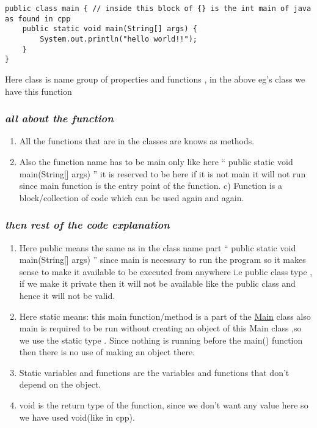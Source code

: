 \documentclass[11pt]{article}
\begin{document}
\begin{verbatim}
public class main { // inside this block of {} is the int main of java as found in cpp
    public static void main(String[] args) {
        System.out.println("hello world!!");
    }
}
\end{verbatim}
Here class is name group of properties and functions , in the above eg's class we have this function
\subsubsection{\emph{all about the function}}
\label{sec:org2ef829a}
\begin{enumerate}
\item All the functions that are in the classes are knows as methods.
\item Also the function name has to be main only like here `` public static void main(String[] args) '' it is reserved to be here if it is not main it will not run since main function is the entry point of the function. c) Function is a block/collection of code which can be used again and again.
\end{enumerate}
\subsubsection{\emph{then rest of the code explanation}}
\label{sec:org50e3d61}
\begin{enumerate}
\item Here public means the same as in the class name part `` public static void main(String[] args) '' since main is necessary to run the program so it makes sense to make it available to be executed from anywhere i.e public class type , if we make it private then it will not be available like the public class and hence it will not be valid.
\item Here static means: this main function/method is a part of the \uline{Main} class also main is required to be run without creating an object of this Main class ,so we use the static type . Since nothing is running before the main() function then there is no use of making an object there.
\item Static variables and functions are the variables and functions that don't depend on the object.
\item void is the return type of the function, since we don't want any value here so we have used void(like in cpp).
\end{enumerate}
\end{document}
